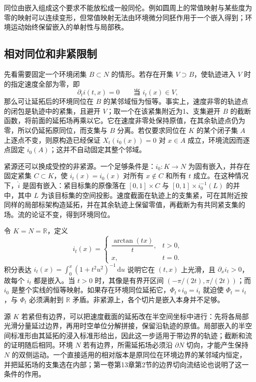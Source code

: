 同位由嵌入组成这个要求不能放松成一般同伦。例如圆周上的常值映射与某些度为零的映射可以连续变形，但常值映射无法由环境微分同胚作用于一个嵌入得到；环境运动始终保留嵌入的单射性与局部秩。

\subsection{相对同位和非紧限制}
\label{g2:subsec:1505:04}

先看需要固定一个环境闭集 \(B\subset N\) 的情形。若存在开集 \(V\supset B\)，使轨迹进入 \(V\) 时的指定速度全部为零，即
\[
	\partial_ti(t,x)=0\qquad\text{当 }i_t(x)\in V,
\]
那么可让延拓后的环境同位在 \(B\) 的某邻域恒为恒等。事实上，速度非零的轨迹点的闭包是轨迹中的紧集，且避开 \(V\)；取一个在该紧集附近为1、支集避开 \(B\) 的截断函数，将前面的延拓场再乘以它。它在速度非零处保持原值，在其余轨迹点仍为零，所以仍延拓原同位，而支集与 \(B\) 分离。若仅要求同位在 \(K\) 的某个闭子集 \(A\) 上逐点不变，则原构造已经保证 \(X_t(i_0(x))=0\) 对 \(x\in A\) 成立，环境流因而逐点固定 \(i_0(A)\)；这并不自动固定其整个邻域。

\ProseParagraphBreak

紧源还可以换成受控的非紧源。一个足够条件是：\(i_0:K\to N\) 为固有嵌入，并存在固定紧集 \(C\subset K\)，使 \(i_t(x)=i_0(x)\) 对所有 \(x\notin C\) 和所有 \(t\) 成立。在这种情况下，\(\widehat i\) 是固有嵌入：紧目标集的原像落在 \([0,1]\times C\) 与 \([0,1]\times i_0^{-1}(L)\) 的并中，其中 \(L\) 为该目标集的空间投影。速度截面在轨迹上的支集紧，可在其附近按同样的局部标架构造延拓，并在其余轨迹上保留零值，再截断为有共同紧支集的场。流的论证不变，得到环境同位。

\begin{example}\label{g2:exm:noncompact-isotopy-no-extension}
	令 \(K=N=\mathbb R\)，定义
	\[
		i_t(x)=\begin{cases}
			\dfrac{\arctan(tx)}{t},&t>0,\\
			x,&t=0.
		\end{cases}
	\]
	积分表达 \(i_t(x)=\int_0^x(1+t^2u^2)^{-1}\,\mathrm{d}u\) 说明它在 \((t,x)\) 上光滑，且 \(\partial_x i_t>0\)，故每个 \(i_t\) 都是嵌入。当 \(t>0\) 时，其像是有界开区间 \((-\pi/(2t),\pi/(2t))\)；而 \(i_0\) 是整个实线的恒等映射。如果存在环境同位延拓它，\(\Phi_t\circ i_0=i_t\) 就迫使 \(\Phi_t=i_t\)，与 \(\Phi_t\) 必须满射到 \(\mathbb R\) 矛盾。非紧源上，各个切片是嵌入本身并不足够。
\end{example}

源 \(K\) 若紧但有边界，可以把速度截面的延拓改在半空间坐标中进行：先将各局部光滑分量延过边界，再用时空单位分解拼接，保留沿轨迹的原值。局部嵌入的半空间标准形由其延拓的浸入标准形给出，因此这一步适用于带边界的轨迹；截断和流的证明随后相同。环境 \(N\) 若有边界，所需延拓场必须沿 \(\partial N\) 切向，才能产生保持 \(N\) 的双侧运动。一个直接适用的相对版本是原同位在环境边界的某邻域内恒定，并把延拓场的支集选在内部；第一卷第13章第2节的边界切向流结论也说明了这一条件的作用。
